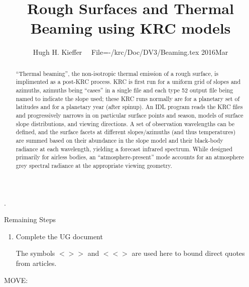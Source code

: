 \documentclass{article}
\title{Rough Surfaces and Thermal Beaming using KRC models}
\author{Hugh H. Kieffer  \ \ File=-/krc/Doc/DV3/Beaming.tex  2016Mar}
\newcommand{\bq}{$ < \! > \!   \! >$ } %
\newcommand{\eq}{ $< \! \! < \! > $ } %
\begin{document}
\maketitle
\tableofcontents
\hrulefill .\hrulefill

\begin{abstract}
``Thermal beaming'', the non-isotropic thermal emission of a rough surface, is
  implimented as a post-KRC process.  KRC is first run for a uniform grid of
  slopes and azimuths, azimuths being ``cases'' in a single file and each type
  52 output file being named to indicate the slope used; these KRC runs normally
  are for a planetary set of latitudes and for a planetary year (after
  spinup). An IDL program reads the KRC files and progressively narrows in on
  particular surface points and season, models of surface slope distributions,
  and viewing directions. A set of observation wavelengths can be defined, and
  the surface facets at different slopes/azimuths (and thus temperatures) are
  summed based on their abundance in the slope model and their black-body
  radiance at each wavelength, yielding a forecast infrared spectrum. While
  designed primarily for airless bodies, an ``atmosphere-present'' mode accounts
  for an atmosphere grey spectral radiance at the appropriate viewing geometry.
\end{abstract}

Remaining Steps \begin{enumerate}    %
 \item Complete the UG document

The symbols \bq and \eq  are used here to bound direct quotes from articles.

\end{enumerate}

\hrulefill MOVE: \hrulefill
\end{document}

